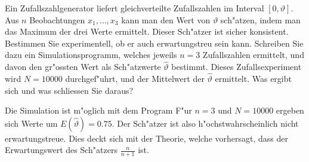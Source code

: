Ein Zufallszahlgenerator liefert gleichverteilte Zufallszahlen im
Interval $[0,\vartheta]$. Aus $n$ Beobachtungen $x_1,\dots,x_3$ kann
man den Wert von $\vartheta$ sch"atzen, indem man das Maximum der
drei Werte ermittelt. Dieser Sch"atzer ist sicher konsistent.
Bestimmen Sie experimentell, ob er auch erwartungstreu sein kann.
Schreiben Sie dazu ein Simulationsprogramm, welches jeweils $n=3$
Zufallszahlen ermittelt, und davon den gr"ossten Wert als
Sch"atzwerte $\hat\vartheta$ bestimmt.
Dieses Zufallsexperiment wird $N=10000$ durchgef"uhrt, und der Mittelwert
der $\hat\vartheta$ ermittelt. Was ergibt sich und was schliessen Sie
daraus?

\begin{loesung}
Die Simulation ist m"oglich mit dem Program
{\small
{}
}
F"ur $n=3$ und $N=10000$ ergeben sich Werte  um $E(\hat\vartheta)=0.75$.
Der Sch"atzer ist also h"ochstwahrscheinlich nicht erwartungstreue.
Dies deckt sich mit der Theorie, welche vorhersagt, dass der Erwartungswert
des Sch"atzers $\frac{n}{n+1}$ ist.
\end{loesung}

